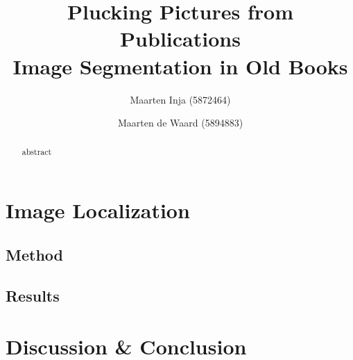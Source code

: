 \documentclass{article} %
\title{Plucking Pictures from Publications\\ \large
Image Segmentation in Old Books}
\author{Maarten Inja (5872464) \and Maarten de Waard (5894883)}
\begin{document}
\maketitle

\begin{abstract}
abstract
\end{abstract}














\section{Image Localization}
\label{sec:imageloc}

\subsection{Method}
\label{subsec:imagelocmethod}

\subsection{Results}
\label{subsec:imagelocresults}


\section{Discussion \& Conclusion}
\label{sec:discussionconclusion}




\end{document}
